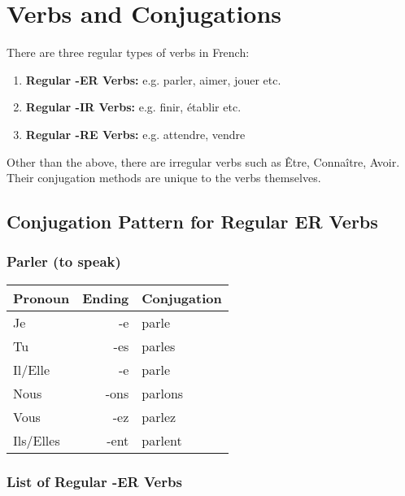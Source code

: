 \section{Verbs and Conjugations}

There are three regular types of verbs in French:
\begin{enumerate}
\item{\textbf{Regular -ER Verbs:} e.g. parler, aimer, jouer etc.}
\item{\textbf{Regular -IR Verbs:} e.g. finir, \'etablir etc.}
\item{\textbf{Regular -RE Verbs:} e.g. attendre, vendre}
\end{enumerate}
Other than the above, there are irregular verbs such as \^Etre, Conna\^itre, Avoir.
Their conjugation methods are unique to the verbs themselves.

\subsection{Conjugation Pattern for Regular ER Verbs}

\subsubsection{Parler (to speak)}
\begin{tabular}{| l | r | l |}
\hline
Pronoun 	& 	Ending 	& 	Conjugation\\ \hline
Je		    &	-e	    & 	parle	\\ 	\hline
Tu		    &	-es	    &	parles	\\	\hline
Il/Elle		&	-e	    &	parle	\\	\hline
Nous		&	-ons	&	parlons	\\	\hline
Vous		&	-ez	    &	parlez	\\	\hline
Ils/Elles	&	-ent	&	parlent	\\	\hline
\end{tabular}

\subsubsection{List of Regular -ER Verbs}

